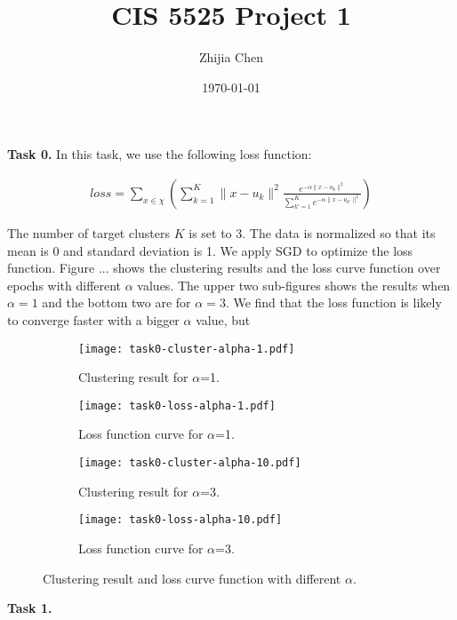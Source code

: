 \documentclass{article}
\title{CIS 5525 Project 1}
\author{Zhijia Chen}
\date{\today}
\begin{document}
\begin{titlepage}
    \maketitle
\end{titlepage}

\textbf{Task 0.}
\vspace{\baselineskip}
In this task, we use the following loss function:

\begin{align*}
    loss = \sum_{x\in \chi}{\left(\sum_{k=1}^{K}\|x-u_k\|^2\frac{e^{-\alpha\|x-u_k\|^2}}{\sum_{k'=1}^{K}e^{-\alpha\|x-u_{k'}\|^2}}\right)}
\end{align*}

The number of target clusters $K$ is set to 3. The data is normalized so that its mean is 0 and standard deviation is 1. We apply SGD to optimize the loss function. Figure ... shows the clustering results and the loss curve function over epochs with different $\alpha$ values. The upper two sub-figures shows the results when $\alpha=1$ and the bottom two are for $\alpha=3$. We find that the loss function is likely to converge faster with a bigger $\alpha$ value, but 
\begin{figure}[h!]
    \centering
    \begin{subfigure}{.33\textwidth}
      \centering
      \texttt{[image: task0-cluster-alpha-1.pdf]}
      \caption{Clustering result for $\alpha$=1.}
      \label{fig:cluster3}
    \end{subfigure}%
    \begin{subfigure}{.66\textwidth}
      \centering
      \texttt{[image: task0-loss-alpha-1.pdf]}
      \caption{Loss function curve for $\alpha$=1.}
      \label{fig:loss3}
    \end{subfigure}
    \centering
    \begin{subfigure}{.33\textwidth}
      \centering
      \texttt{[image: task0-cluster-alpha-10.pdf]}
      \caption{Clustering result for $\alpha$=3.}
      \label{fig:cluster3}
    \end{subfigure}%
    \begin{subfigure}{.66\textwidth}
      \centering
      \texttt{[image: task0-loss-alpha-10.pdf]}
      \caption{Loss function curve for $\alpha$=3.}
      \label{fig:loss3}
    \end{subfigure}
    \caption{Clustering result and loss curve function with different $\alpha$.}
    \label{task0}
\end{figure}

\textbf{Task 1.}
\vspace{\baselineskip}
\end{document}
